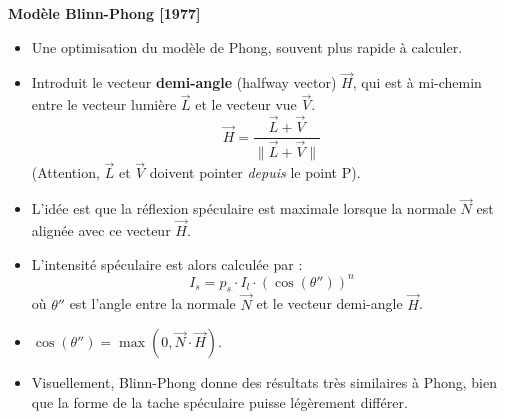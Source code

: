 \textbf{Modèle Blinn-Phong [1977]}
\begin{itemize}
    \item Une optimisation du modèle de Phong, souvent plus rapide à calculer.
    \item Introduit le vecteur \textbf{demi-angle} (halfway vector) \(\vec{H}\), qui est à mi-chemin entre le vecteur lumière \(\vec{L}\) et le vecteur vue \(\vec{V}\).
    \[ \vec{H} = \frac{\vec{L} + \vec{V}}{\|\vec{L} + \vec{V}\|} \]
    (Attention, \(\vec{L}\) et \(\vec{V}\) doivent pointer \textit{depuis} le point P).
    \item L'idée est que la réflexion spéculaire est maximale lorsque la normale \(\vec{N}\) est alignée avec ce vecteur \(\vec{H}\).
    \item L'intensité spéculaire est alors calculée par :
    \[ I_s = p_s \cdot I_l \cdot (\cos(\theta''))^n \]
    où \(\theta''\) est l'angle entre la normale \(\vec{N}\) et le vecteur demi-angle \(\vec{H}\).
    \item \(\cos(\theta'') = \max(0, \vec{N} \cdot \vec{H})\).
    \item Visuellement, Blinn-Phong donne des résultats très similaires à Phong, bien que la forme de la tache spéculaire puisse légèrement différer.
\end{itemize}
